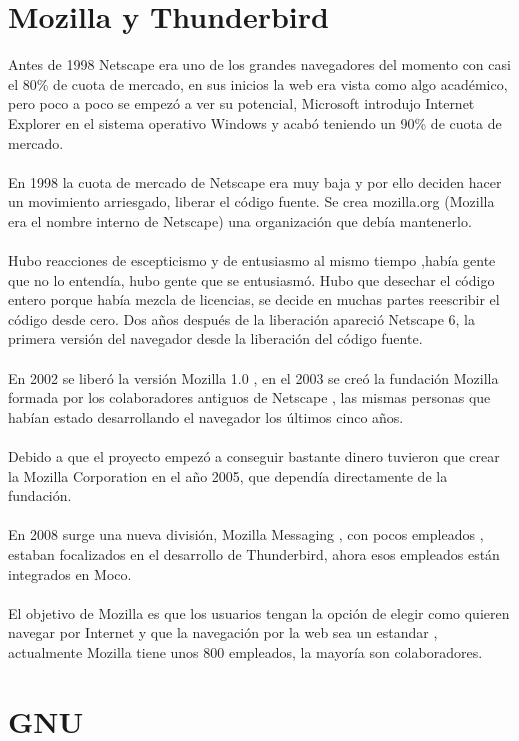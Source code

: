 \documentclass[a4paper,oneside,11pt]{article}
\begin{document}
\section{Mozilla y Thunderbird}

Antes de 1998 Netscape era uno de los grandes navegadores del momento con casi el 80\% de cuota de mercado, en sus inicios la web
era vista como algo acad\'emico, pero poco a poco se empez\'o a ver su potencial, Microsoft introdujo Internet Explorer en el 
sistema operativo Windows y acab\'o teniendo un 90\% de cuota de mercado.
\\\\
En 1998 la cuota de mercado de Netscape era muy baja y por ello deciden hacer un movimiento arriesgado, liberar el
c\'odigo fuente. Se crea mozilla.org (Mozilla era el nombre interno de Netscape) una organizaci\'on que deb\'ia mantenerlo.
 \\\\
Hubo reacciones de escepticismo y de entusiasmo al mismo tiempo ,hab\'ia gente que no lo entend\'ia, hubo gente que se entusiasm\'o. 
Hubo que desechar el c\'odigo entero porque hab\'ia mezcla de licencias, se decide en muchas partes reescribir el c\'odigo desde cero.
Dos años despu\'es de la liberaci\'on apareci\'o Netscape 6, la primera versi\'on del navegador desde la liberaci\'on del c\'odigo fuente.
\\\\
En 2002 se liber\'o la versi\'on Mozilla 1.0 , en el 2003 se cre\'o la fundaci\'on Mozilla formada por los colaboradores
antiguos de Netscape , las mismas personas que hab\'ian estado desarrollando el navegador los \'ultimos cinco años.
\\\\
Debido a que el proyecto empez\'o a conseguir bastante dinero tuvieron que crear la Mozilla Corporation en el año 2005, que 
depend\'ia directamente de la fundaci\'on.
\\\\
En 2008 surge una nueva divisi\'on, Mozilla Messaging , con pocos empleados , estaban focalizados en el desarrollo de Thunderbird, 
ahora esos empleados est\'an integrados en Moco.
\\\\
El objetivo de Mozilla es que los usuarios tengan la opci\'on de elegir como quieren navegar por Internet y que la 
navegaci\'on por la web sea un estandar , actualmente Mozilla tiene unos 800 empleados, la mayor\'ia 
son colaboradores. 

\section{GNU}
\end{document}

